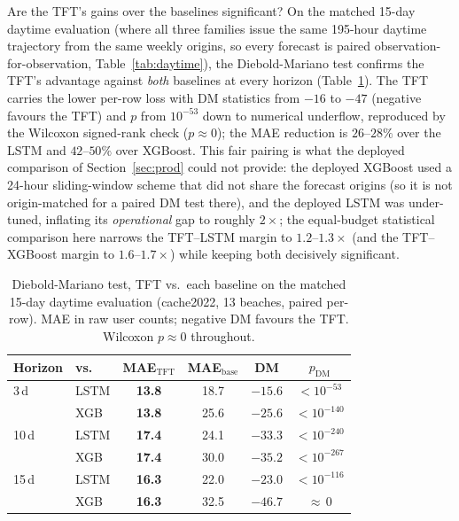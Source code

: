 \documentclass[twocolumn,twoside,a4paper,10pt]{IEEEtran}
\begin{document}
Are the TFT's gains over the baselines significant? On the matched 15-day daytime evaluation (where all three families issue the same 195-hour daytime trajectory from the same weekly origins, so every forecast is paired observation-for-observation, Table~\ref{tab:daytime}), the Diebold-Mariano test confirms the TFT's advantage against \emph{both} baselines at every horizon (Table~\ref{tab:dm}). The TFT carries the lower per-row loss with DM statistics from $-16$ to $-47$ (negative favours the TFT) and $p$ from $10^{-53}$ down to numerical underflow, reproduced by the Wilcoxon signed-rank check ($p\approx0$); the MAE reduction is $26$--$28\%$ over the LSTM and $42$--$50\%$ over XGBoost. This fair pairing is what the deployed comparison of Section~\ref{sec:prod} could not provide: the deployed XGBoost used a 24-hour sliding-window scheme that did not share the forecast origins (so it is not origin-matched for a paired DM test there), and the deployed LSTM was under-tuned, inflating its \emph{operational} gap to roughly $2\times$; the equal-budget statistical comparison here narrows the TFT--LSTM margin to $1.2$--$1.3\times$ (and the TFT--XGBoost margin to $1.6$--$1.7\times$) while keeping both decisively significant.

\begin{table}[!t]
    \caption{Diebold-Mariano test, TFT vs.\ each baseline on the matched 15-day daytime evaluation (cache2022, 13 beaches, paired per-row). MAE in raw user counts; negative DM favours the TFT. Wilcoxon $p\approx0$ throughout.}
    \label{tab:dm}
    \begin{center}
    \footnotesize
    \begin{tabular}{llcccc}
        \toprule
        Horizon & vs.\ & MAE$_\text{TFT}$ & MAE$_\text{base}$ & DM & $p_\text{DM}$ \\
        \midrule
         3\,d  & LSTM & \textbf{13.8} & 18.7 & $-15.6$ & $<10^{-53}$  \\
               & XGB  & \textbf{13.8} & 25.6 & $-25.6$ & $<10^{-140}$ \\
        \midrule
        10\,d  & LSTM & \textbf{17.4} & 24.1 & $-33.3$ & $<10^{-240}$ \\
               & XGB  & \textbf{17.4} & 30.0 & $-35.2$ & $<10^{-267}$ \\
        \midrule
        15\,d  & LSTM & \textbf{16.3} & 22.0 & $-23.0$ & $<10^{-116}$ \\
               & XGB  & \textbf{16.3} & 32.5 & $-46.7$ & ${\approx}\,0$ \\
        \bottomrule
    \end{tabular}
    \end{center}
\end{table}
\end{document}
